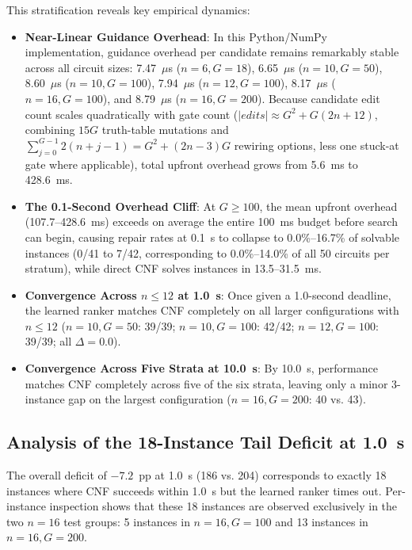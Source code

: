 \documentclass[11pt]{article}
\begin{document}
This stratification reveals key empirical dynamics:
\begin{itemize}
    \item \textbf{Near-Linear Guidance Overhead}: In this Python/NumPy implementation, guidance overhead per candidate remains remarkably stable across all circuit sizes: 7.47~$\mu$s ($n=6, G=18$), 6.65~$\mu$s ($n=10, G=50$), 8.60~$\mu$s ($n=10, G=100$), 7.94~$\mu$s ($n=12, G=100$), 8.17~$\mu$s ($n=16, G=100$), and 8.79~$\mu$s ($n=16, G=200$). Because candidate edit count scales quadratically with gate count ($|edits| \approx G^2 + G(2n + 12)$, combining $15G$ truth-table mutations and $\sum_{j=0}^{G-1} 2(n + j - 1) = G^2 + (2n-3)G$ rewiring options, less one stuck-at gate where applicable), total upfront overhead grows from 5.6~ms to 428.6~ms.
    \item \textbf{The 0.1-Second Overhead Cliff}: At $G \ge 100$, the mean upfront overhead (107.7--428.6~ms) exceeds on average the entire 100~ms budget before search can begin, causing repair rates at 0.1~s to collapse to 0.0\%--16.7\% of solvable instances (0/41 to 7/42, corresponding to 0.0\%--14.0\% of all 50 circuits per stratum), while direct CNF solves instances in 13.5--31.5~ms.
    \item \textbf{Convergence Across $n \le 12$ at 1.0~s}: Once given a 1.0-second deadline, the learned ranker matches CNF completely on all larger configurations with $n \le 12$ ($n=10, G=50$: 39/39; $n=10, G=100$: 42/42; $n=12, G=100$: 39/39; all $\Delta = 0.0$).
    \item \textbf{Convergence Across Five Strata at 10.0~s}: By 10.0~s, performance matches CNF completely across five of the six strata, leaving only a minor 3-instance gap on the largest configuration ($n=16, G=200$: 40 vs. 43).
\end{itemize}

\subsection{Analysis of the 18-Instance Tail Deficit at 1.0~s}
The overall deficit of $-7.2$~pp at 1.0~s (186 vs. 204) corresponds to exactly 18 instances where CNF succeeds within 1.0~s but the learned ranker times out. Per-instance inspection shows that these 18 instances are observed exclusively in the two $n=16$ test groups: 5 instances in $n=16, G=100$ and 13 instances in $n=16, G=200$.
\end{document}
